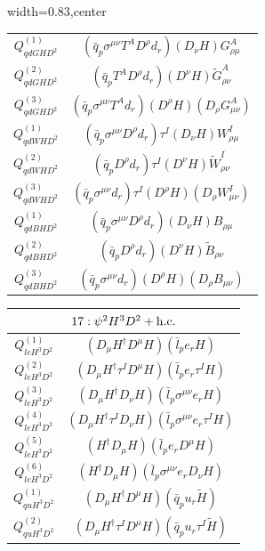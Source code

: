 \begin{table}[H]
\begin{center}
\begin{adjustbox}{width=0.83\textwidth,center}
\begin{minipage}[t]{5.8cm}
\begin{tabular}[t]{c|c}
%
$Q_{qdGHD^2}^{(1)}$  &  $(\bar q_p \sigma^{\mu\nu} T^A D^\rho d_r) (D_\nu H) G^A_{\rho\mu}$ \\
%
$Q_{qdGHD^2}^{(2)}$  &  $(\bar q_p  T^A D^\rho d_r) (D^\nu H) \widetilde G^A_{\rho\nu}$ \\
%
$Q_{qdGHD^2}^{(3)}$  &  $(\bar q_p \sigma^{\mu\nu} T^A d_r) (D^\rho H) (D_\rho G^A_{\mu\nu})$ \\
%
$Q_{qdWHD^2}^{(1)}$  &  $(\bar q_p \sigma^{\mu\nu} D^\rho d_r) \tau^I (D_\nu H) W^I_{\rho\mu}$ \\
%
$Q_{qdWHD^2}^{(2)}$  &  $(\bar q_p  D^\rho d_r) \tau^I (D^\nu H) \widetilde W^I_{\rho\nu}$ \\
%
$Q_{qdWHD^2}^{(3)}$  &  $(\bar q_p \sigma^{\mu\nu} d_r) \tau^I (D^\rho H) (D_\rho W^I_{\mu\nu})$ \\
%
$Q_{qdBHD^2}^{(1)}$  &  $(\bar q_p \sigma^{\mu\nu} D^\rho d_r) (D_\nu H) B_{\rho\mu}$ \\
%
$Q_{qdBHD^2}^{(2)}$  &  $(\bar q_p D^\rho d_r) (D^\nu H) \widetilde B_{\rho\nu}$ \\
%
$Q_{qdBHD^2}^{(3)}$  &  $(\bar q_p \sigma^{\mu\nu} d_r) (D^\rho H) (D_\rho B_{\mu\nu})$ 
\end{tabular}
\end{minipage}
\hspace{1cm}
\begin{minipage}[t]{5.7cm}
\renewcommand{\arraystretch}{1.5}
\begin{tabular}[t]{c|c}
\multicolumn{2}{c}{\boldmath$17:\psi^2H^3D^2 + \mathrm{h.c.}$} \\
\hline
$Q_{leH^3D^2}^{(1)}$  & $(D_\mu H^\dag D^\mu H) (\bar l_p e_r H)$ \\
%
$Q_{leH^3D^2}^{(2)}$  & $(D_\mu H^\dag \tau^I D^\mu H) (\bar l_p e_r \tau^I H)$ \\
%
$Q_{leH^3D^2}^{(3)}$  & $(D_\mu H^\dag D_\nu H) (\bar l_p \sigma^{\mu\nu} e_r H)$ \\
%
$Q_{leH^3D^2}^{(4)}$  & $(D_\mu H^\dag \tau^I D_\nu H) (\bar l_p \sigma^{\mu\nu} e_r \tau^I H)$ \\
%
$Q_{leH^3D^2}^{(5)}$  & $(H^\dag D_\mu H) (\bar l_p e_r D^\mu H)$ \\
%
$Q_{leH^3D^2}^{(6)}$  & $(H^\dag D_\mu H) (\bar l_p \sigma^{\mu\nu} e_r D_\nu H)$ \\
%
$Q_{quH^3D^2}^{(1)}$  & $(D_\mu H^\dag D^\mu H) (\bar q_p u_r \widetilde H)$ \\
%
$Q_{quH^3D^2}^{(2)}$  & $(D_\mu H^\dag \tau^I D^\mu H) (\bar q_p u_r \tau^I \widetilde H)$ \\

\end{tabular}
\end{minipage}
\end{adjustbox}
\end{center}
\end{table}
